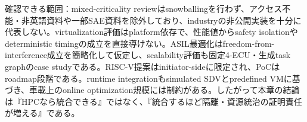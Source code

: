 \begin{claimboundary}
確認できる範囲：mixed-criticality reviewはsnowballingを行わず、アクセス不能・非英語資料や一部SAE資料を除外しており、industryの非公開実装を十分に代表しない。virtualization評価はplatform依存で、性能値からsafety isolationやdeterministic timingの成立を直接導けない。ASIL最適化はfreedom-from-interference成立を簡略化して仮定し、scalability評価も固定4-ECU・生成task graphのcase studyである。RISC-V提案はinitiator-sideに限定され、PoCはroadmap段階である。runtime integrationもsimulated SDVとpredefined VMに基づき、車載上のonline optimization規模には制約がある。したがって本章の結論は『HPCなら統合できる』ではなく、『統合するほど隔離・資源統治の証明責任が増える』である。\autocite{src-6ad0c67eaab9,src-8deb33ac8e08,src-9f1d8b2b8944,src-f657aea94b5e,src-fe402f610af7}
\end{claimboundary}
